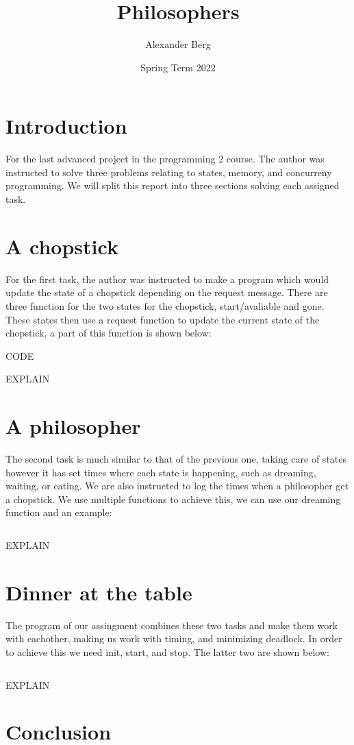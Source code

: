 \documentclass[a4paper,11pt]{article}
\begin{document}
\title{
    \textbf{Philosophers}
}
\author{Alexander Berg}
\date{Spring Term 2022}

\maketitle

\section*{Introduction}

For the last advanced project in the programming 2 course. The author was instructed to solve three problems relating to states, memory, and concurreny programming. We will split this report into three sections solving each assigned task.

\section*{A chopstick}

For the first task, the author was instructed to make a program which would update the state of a chopstick depending on the request message. There are three function for the two states for the chopstick, start/avaliable and gone. These states then use a request function to update the current state of the chopstick, a part of this function is shown below:

CODE

EXPLAIN

\section*{A philosopher}

The second task is much similar to that of the previous one, taking care of states however it has set times where each state is happening, such as dreaming, waiting, or eating. We are also instructed to log the times when a philosopher get a chopstick. We use multiple functions to achieve this, we can use our dreaming function and an example:

\begin{verbatim}

\end{verbatim}

EXPLAIN

\section*{Dinner at the table}

The program of our assingment combines these two tasks and make them work with eachother, making us work with timing, and minimizing deadlock. In order to achieve this we need init, start, and stop. The latter two are shown below:

\begin{verbatim}

\end{verbatim}

EXPLAIN

\section*{Conclusion}
\end{document}
